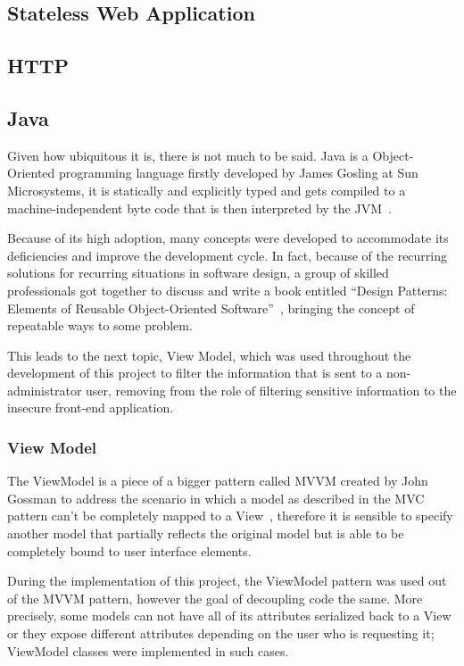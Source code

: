 \subsection{Stateless Web Application}

\subsection{HTTP}
\subsection{Java}
Given how ubiquitous it is, there is not much to be said. Java is a Object-Oriented programming language firstly developed by James Gosling at Sun Microsystems, it is statically and explicitly typed and gets compiled to a machine-independent byte code that is then interpreted by the \gls{JVM}~\cite{java}.

Because of its high adoption, many concepts were developed to accommodate its deficiencies and improve the development cycle. In fact, because of the recurring solutions for recurring situations in software design, a group of skilled professionals got together to discuss and write a book entitled ``Design Patterns: Elements of Reusable Object-Oriented Software''~\cite{patterns}, bringing the concept of repeatable ways to some problem.

This leads to the next topic, View Model, which was used throughout the development of this project to filter the information that is sent to a non-administrator user, removing from the role of filtering sensitive information to the insecure front-end application.

\subsubsection{View Model}
The ViewModel is a piece of a bigger pattern called \gls{MVVM} created by John Gossman to address the scenario in which a model as described in the \gls{MVC} pattern can't be completely mapped to a View~\cite{viewmodel}, therefore it is sensible to specify another model that partially reflects the original model but is able to be completely bound to user interface elements.

During the implementation of this project, the ViewModel pattern was used out of the \gls{MVVM} pattern, however the goal of decoupling code the same. More precisely, some models can not have all of its attributes serialized back to a View or they expose different attributes depending on the user who is requesting it; ViewModel classes were implemented in such cases.

